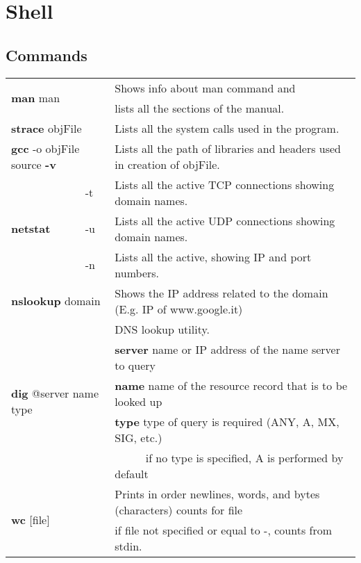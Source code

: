 \chapter{Shell}

\section{Commands}

\begin{table}[h]
\centering
\footnotesize
\begin{tabular}{|l|l|l|}
\hline
\multicolumn{2}{|l|}{\multirow{2}{*}{\textbf{man} man}}&{Shows info about man command and}\\
\multicolumn{2}{|l|}{} & {lists all the sections of the manual.}\\
\hline
\multicolumn{2}{|l|}{\textbf{strace} objFile} & {Lists all the system calls used in the program.}\\
\hline
\multicolumn{2}{|l|}{\textbf{gcc} -o objFile source \textbf{-v}} & {Lists all the path of libraries and headers used in creation of objFile.}\\
\hline
\multirow{3}{*}{\textbf{netstat}} & {-t} & {Lists all the active TCP connections showing domain names.}\\
\cline{2-3}
& {-u} & {Lists all the active UDP connections showing domain names.}\\
\cline{2-3}
& {-n} & {Lists all the active, showing IP and port numbers.}\\
\hline
\multicolumn{2}{|l|}{\textbf{nslookup} domain} & {Shows the IP address related to the domain (E.g. IP of www.google.it)}\\
\hline
\multicolumn{2}{|l|}{\multirow{5}{*}{\textbf{dig} @server name type}}&{DNS lookup utility.}\\
\multicolumn{2}{|l|}{}&{\textbf{server} name or IP address of the name server to query}\\
\multicolumn{2}{|l|}{}&{\textbf{name} name of the resource record that is to be looked up}\\
\multicolumn{2}{|l|}{}&{\textbf{type} type of query is required (ANY, A, MX, SIG, etc.)}\\
\multicolumn{2}{|l|}{}&{$\;\;\;\;\;\;\;\;\;\;$if no type is specified, A is performed by default}\\
\hline
\multicolumn{2}{|l|}{\multirow{2}{*}{\textbf{wc} [file]}} & {Prints in order newlines, words, and bytes (characters) counts for file}\\
\multicolumn{2}{|l|}{} & {if file not specified or equal to -, counts from stdin.}\\
\hline
\end{tabular}
\end{table}


